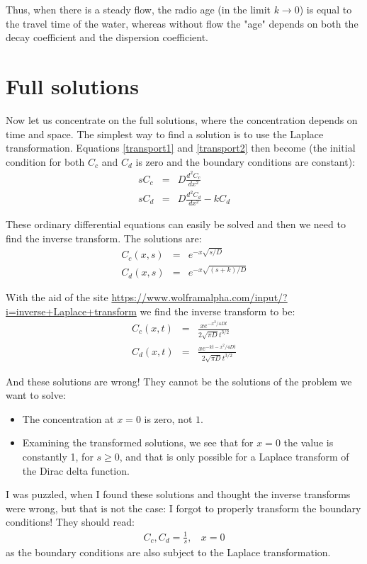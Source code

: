 \documentclass[onecolumn]{article}
\begin{document}
Thus, when there is a steady flow, the radio age (in the limit $k \rightarrow 0$) is equal to the travel time of the water,
whereas without flow the "age" depends on both the decay coefficient and the dispersion coefficient.


\section*{Full solutions}
Now let us concentrate on the full solutions, where the concentration depends on time and space.
The simplest way to find a solution is to use the Laplace transformation. Equations \ref{transport1} and \ref{transport2} then
become (the initial condition for both $C_c$ and $C_d$ is zero and the boundary conditions are constant):
\begin{eqnarray}
    s C_c &=& D \frac{d^2 C_c}{d x^2} \\
    s C_d &=& D \frac{d^2 C_d}{d x^2} - k C_d
\end{eqnarray}

These ordinary differential equations can easily be solved and then we need to find the inverse transform. The
solutions are:
\begin{eqnarray}
    C_c(x,s) &=& e^{-x \sqrt{s/D}} \\
    C_d(x,s) &=& e^{-x \sqrt{(s+k)/ D}}
\end{eqnarray}

With the aid of the site \url{https://www.wolframalpha.com/input/?i=inverse+Laplace+transform} we find the inverse
transform to be:
\begin{eqnarray}
    C_c(x,t) &=& \frac{x e^{-x^2/4Dt}}{2 \sqrt{\pi D} t^{3/2}}     \\
    C_d(x,t) &=& \frac{x e^{-kt -x^2/4Dt}}{2 \sqrt{\pi D} t^{3/2}}
\end{eqnarray}

And these solutions are wrong! They cannot be the solutions of the problem we want to solve:
\begin{itemize}
\item
The concentration at $x = 0$ is zero, not $1$.
\item
Examining the transformed solutions, we see that for $x = 0$ the value is constantly 1, for $s \geq 0$, and that is only possible
for a Laplace transform of the Dirac delta function.
\end{itemize}

I was puzzled, when I found these solutions and thought the inverse transforms were wrong, but that is not the
case: I forgot to properly transform the boundary conditions! They should read:
\begin{eqnarray}
    C_c, C_d = \frac{1}{s}, ~~~~x = 0
\end{eqnarray}
\noindent as the boundary conditions are also subject to the Laplace transformation.
\end{document}
